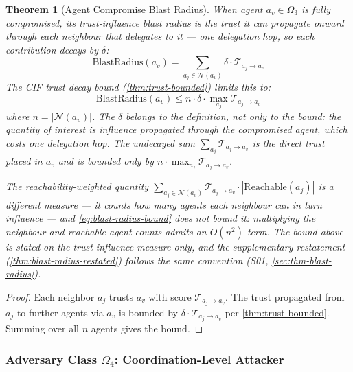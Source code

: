 \documentclass[
]{article}
\newtheorem{theorem}{Theorem}[section]
\begin{document}
\begin{theorem}[Agent Compromise Blast Radius]
\label{thm:blast-radius}
When agent $a_v \in \Omega_3$ is fully compromised, its \emph{trust-influence blast
radius} is the trust it can propagate onward through each neighbour that
delegates to it --- one delegation hop, so each contribution decays by $\delta$:
\begin{equation}
\label{eq:blast-radius}
\text{BlastRadius}(a_v) = \sum_{a_j \in \mathcal{N}(a_v)} \delta \cdot \mathcal{T}_{a_j \to a_v}
\end{equation}
The CIF trust decay bound (\cref{thm:trust-bounded}) limits this to:
\begin{equation}
\label{eq:blast-radius-bound}
\text{BlastRadius}(a_v) \leq n \cdot \delta \cdot \max_{a_j} \mathcal{T}_{a_j \to a_v}
\end{equation}
where $n = |\mathcal{N}(a_v)|$. The $\delta$ belongs to the definition, not only to
the bound: the quantity of interest is influence \emph{propagated through} the
compromised agent, which costs one delegation hop. The undecayed sum
$\sum_{a_j} \mathcal{T}_{a_j \to a_v}$ is the direct trust placed in $a_v$ and is
bounded only by $n \cdot \max_{a_j} \mathcal{T}_{a_j \to a_v}$.

The reachability-weighted quantity
$\sum_{a_j \in \mathcal{N}(a_v)} \mathcal{T}_{a_j \to a_v} \cdot |\text{Reachable}(a_j)|$
is a different measure --- it counts how many agents each neighbour can in turn
influence --- and \cref{eq:blast-radius-bound} does not bound it: multiplying the
neighbour and reachable-agent counts admits an $O(n^2)$ term. The bound above is
stated on the trust-influence measure only, and the supplementary restatement
(\cref{thm:blast-radius-restated}) follows the same convention
(S01, \cref{sec:thm-blast-radius}).
\end{theorem}

\begin{proof}
Each neighbor $a_j$ trusts $a_v$ with score $\mathcal{T}_{a_j \to a_v}$. The trust propagated from $a_j$ to further agents via $a_v$ is bounded by $\delta \cdot \mathcal{T}_{a_j \to a_v}$ per \cref{thm:trust-bounded}. Summing over all $n$ agents gives the bound.
\end{proof}

\subsubsection{\texorpdfstring{Adversary Class \(\Omega_4\):
Coordination-Level
Attacker}{Adversary Class Omega_4: Coordination-Level Attacker}}\label{adversary-class-omega_4-coordination-level-attacker}
\end{document}
